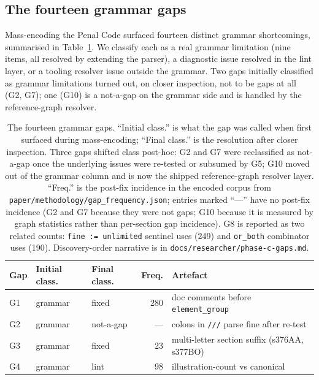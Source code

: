 \subsection{The fourteen grammar gaps}
\label{subsec:gaps}
Mass-encoding the Penal Code surfaced fourteen distinct grammar
shortcomings, summarised in Table~\ref{tab:gaps}. We classify each as
a real grammar limitation (nine items, all resolved by extending the
parser), a diagnostic issue resolved in the lint layer, or a tooling
resolver issue outside the grammar. Two gaps initially classified as
grammar limitations turned out, on closer inspection, not to be gaps at
all (\textsf{G2}, \textsf{G7}); one (\textsf{G10}) is a not-a-gap on
the grammar side and is handled by the reference-graph resolver.

\begin{table}[t]
\caption{The fourteen grammar gaps. ``Initial class.'' is what the
gap was called when first surfaced during mass-encoding; ``Final
class.'' is the resolution after closer inspection. Three gaps shifted
class post-hoc: \textsf{G2} and \textsf{G7} were reclassified as
not-a-gap once the underlying issues were re-tested or subsumed by
\textsf{G5}; \textsf{G10} moved out of the grammar column and is now
the shipped reference-graph resolver layer. ``Freq.'' is the post-fix incidence in the encoded
corpus from \texttt{paper/methodology/gap\_frequency.json}; entries
marked ``---'' have no post-fix incidence (G2 and G7 because they were
not gaps; G10 because it is measured by graph statistics rather than
per-section gap incidence).
\textsf{G8} is reported as two related counts:
\texttt{fine := unlimited} sentinel uses (249) and \texttt{or\_both}
combinator uses (190). Discovery-order narrative is in
\texttt{docs/researcher/phase-c-gaps.md}.}
\label{tab:gaps}
\begin{small}
\begin{tabular}{@{}lllrp{3.6cm}@{}}
\toprule
\textbf{Gap} & \textbf{Initial class.} & \textbf{Final class.} & \textbf{Freq.} & \textbf{Artefact} \\ \midrule
\textsf{G1}  & grammar       & fixed     & 280 & doc comments before \texttt{element\_group} \\
\textsf{G2}  & grammar       & not-a-gap & ---  & colons in \texttt{///} parse fine after re-test \\
\textsf{G3}  & grammar       & fixed     &  23 & multi-letter section suffix (s376AA, s377BO) \\
\textsf{G4}  & grammar       & lint      &  98 & illustration-count vs canonical \\

\end{tabular}
\end{small}
\end{table}
